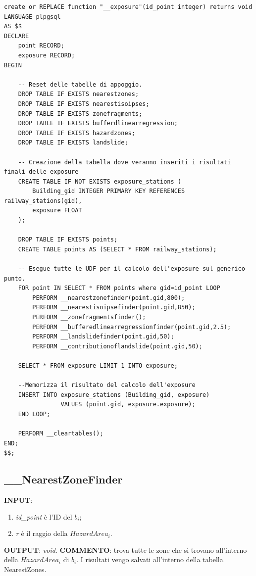 \small
\begin{lstlisting}[style = mystyle]
create or REPLACE function "__exposure"(id_point integer) returns void
LANGUAGE plpgsql
AS $$
DECLARE
	point RECORD;
	exposure RECORD;
BEGIN
	
	-- Reset delle tabelle di appoggio.
	DROP TABLE IF EXISTS nearestzones;
	DROP TABLE IF EXISTS nearestisoipses;
	DROP TABLE IF EXISTS zonefragments;
	DROP TABLE IF EXISTS bufferdlinearregression;
	DROP TABLE IF EXISTS hazardzones;
	DROP TABLE IF EXISTS landslide;
	
	-- Creazione della tabella dove veranno inseriti i risultati finali delle exposure
	CREATE TABLE IF NOT EXISTS exposure_stations (
		Building_gid INTEGER PRIMARY KEY REFERENCES railway_stations(gid),
		exposure FLOAT
	);

	DROP TABLE IF EXISTS points;
	CREATE TABLE points AS (SELECT * FROM railway_stations);

	-- Esegue tutte le UDF per il calcolo dell'exposure sul generico punto.
	FOR point IN SELECT * FROM points where gid=id_point LOOP
		PERFORM __nearestzonefinder(point.gid,800);
		PERFORM __nearestisoipsefinder(point.gid,850);
		PERFORM __zonefragmentsfinder();
		PERFORM __bufferedlinearregressionfinder(point.gid,2.5);
		PERFORM __landslidefinder(point.gid,50);
		PERFORM __contributionoflandslide(point.gid,50);

	SELECT * FROM exposure LIMIT 1 INTO exposure;
	
	--Memorizza il risultato del calcolo dell'exposure
	INSERT INTO exposure_stations (Building_gid, exposure) 
				VALUES (point.gid, exposure.exposure);
	END LOOP;

	PERFORM __cleartables();
END;
$$;
\end{lstlisting}

\newpage
\subsection{\_\_NearestZoneFinder}
\textbf{INPUT}: 
\begin{enumerate}
	\item \textit{id\_point} è l'ID del $b_i$;
	\item \textit{r} è il raggio della $HazardArea_i$.
\end{enumerate}
\textbf{OUTPUT}: \textit{void}. \newline
\textbf{COMMENTO}: trova tutte le zone che si trovano all'interno della $HazardArea_i$ di $b_i$. I risultati vengo salvati all'interno della tabella NearestZones.

